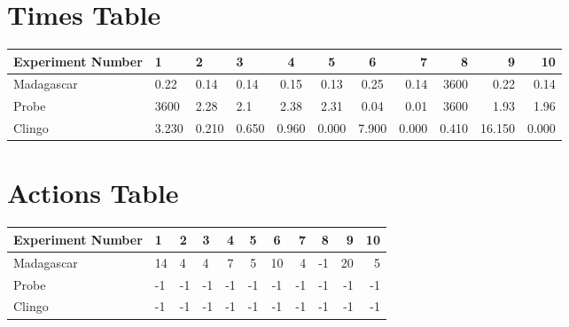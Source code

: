 \documentclass[8pt]{article}
\begin{document}
\begin{landscape}
\section{Times Table}\begin{tabular}{ | l | l | l | l | c | c | c | r | r | r | r | }\hline
Experiment Number & 1 & 2 & 3 & 4 & 5 & 6 & 7 & 8 & 9 & 10\\  \hline
Madagascar & 0.22 & 0.14 & 0.14 & 0.15 & 0.13 & 0.25 & 0.14 & 3600 & 0.22 & 0.14\\  \hline
Probe & 3600 & 2.28 & 2.1 & 2.38 & 2.31 & 0.04 & 0.01 & 3600 & 1.93 & 1.96\\  \hline
Clingo & 3.230 & 0.210 & 0.650 & 0.960 & 0.000 & 7.900 & 0.000 & 0.410 & 16.150 & 0.000\\ \hline
\end{tabular}
\section{Actions Table}\begin{tabular}{ | l | l | l | l | c | c | c | r | r | r | r | }\hline
Experiment Number & 1 & 2 & 3 & 4 & 5 & 6 & 7 & 8 & 9 & 10\\ \hline
 Madagascar & 14 & 4 & 4 & 7 & 5 & 10 & 4 & -1 & 20 & 5\\ \hline
 Probe & -1 & -1 & -1 & -1 & -1 & -1 & -1 & -1 & -1 & -1\\ \hline
 Clingo & -1 & -1 & -1 & -1 & -1 & -1 & -1 & -1 & -1 & -1\\ \hline
\end{tabular}
\end{landscape}
\end{document}
